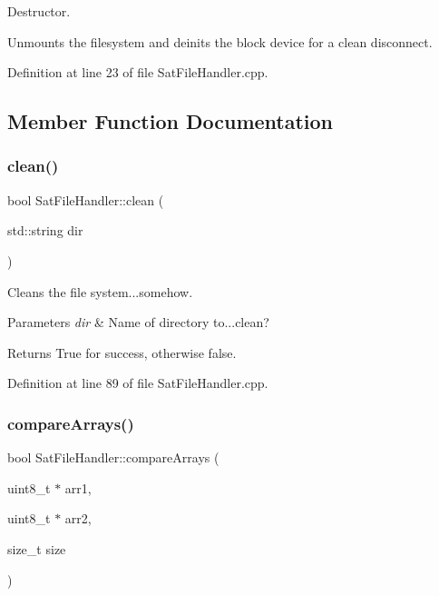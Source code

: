 Destructor. 

Unmounts the filesystem and deinits the block device for a clean disconnect. 

Definition at line 23 of file Sat\+File\+Handler.\+cpp.



\subsection{Member Function Documentation}
\mbox{\label{class_sat_file_handler_a61cd259dd830e9ee5044f22e127982a4}} 
\subsubsection{\texorpdfstring{clean()}{clean()}}
{\footnotesize\ttfamily bool Sat\+File\+Handler\+::clean (\begin{DoxyParamCaption}\item[{std\+::string}]{dir }\end{DoxyParamCaption})\hspace{0.3cm}{\ttfamily [private]}}



Cleans the file system...somehow. 


\begin{DoxyParams}{Parameters}
{\em dir} & Name of directory to...clean? \\
\hline
\end{DoxyParams}
\begin{DoxyReturn}{Returns}
True for success, otherwise false. 
\end{DoxyReturn}


Definition at line 89 of file Sat\+File\+Handler.\+cpp.

\mbox{\label{class_sat_file_handler_ac65b0803b09b8ad0ab172e0db3fddd21}} 
\subsubsection{\texorpdfstring{compareArrays()}{compareArrays()}}
{\footnotesize\ttfamily bool Sat\+File\+Handler\+::compare\+Arrays (\begin{DoxyParamCaption}\item[{uint8\+\_\+t $\ast$}]{arr1,  }\item[{uint8\+\_\+t $\ast$}]{arr2,  }\item[{size\+\_\+t}]{size }\end{DoxyParamCaption})\hspace{0.3cm}{\ttfamily [private]}}



